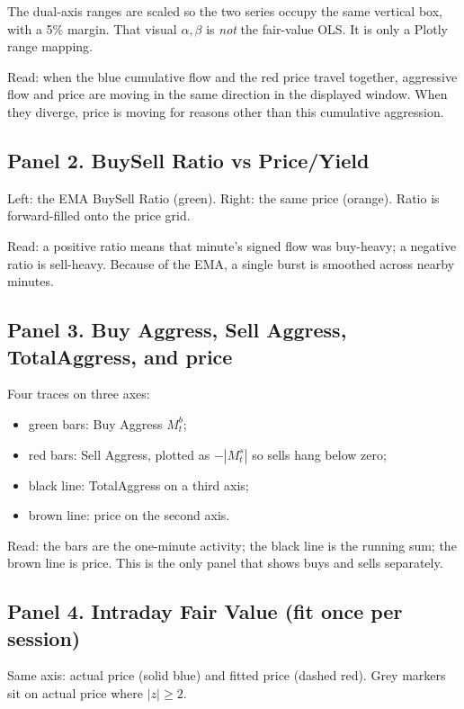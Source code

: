 \documentclass[11pt]{article}
\begin{document}
The dual-axis ranges are scaled so the two series occupy the same
vertical box, with a 5\% margin.  That visual \(\alpha,\beta\) is
\emph{not} the fair-value OLS.  It is only a Plotly range mapping.

Read: when the blue cumulative flow and the red price travel together,
aggressive flow and price are moving in the same direction in the
displayed window.  When they diverge, price is moving for reasons other
than this cumulative aggression.

\subsection{Panel 2. BuySell Ratio vs Price/Yield}

Left: the EMA BuySell Ratio (green).  Right: the same price (orange).
Ratio is forward-filled onto the price grid.

Read: a positive ratio means that minute's signed flow was buy-heavy; a
negative ratio is sell-heavy.  Because of the EMA, a single burst is
smoothed across nearby minutes.

\subsection{Panel 3. Buy Aggress, Sell Aggress, TotalAggress, and price}

Four traces on three axes:

\begin{itemize}
    \item green bars: Buy Aggress \(M_t^b\);
    \item red bars: Sell Aggress, plotted as \(-|M_t^s|\) so sells hang
    below zero;
    \item black line: TotalAggress on a third axis;
    \item brown line: price on the second axis.
\end{itemize}

Read: the bars are the one-minute activity; the black line is the
running sum; the brown line is price.  This is the only panel that shows
buys and sells separately.

\subsection{Panel 4. Intraday Fair Value (fit once per session)}

Same axis: actual price (solid blue) and fitted price (dashed red).
Grey markers sit on actual price where \(|z|\ge 2\).
\end{document}
